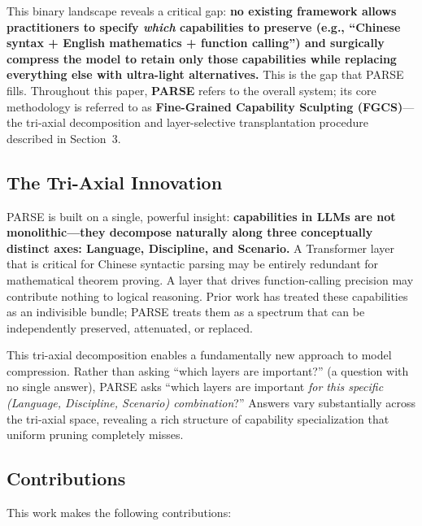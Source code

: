 \documentclass[twocolumn]{article}
\begin{document}
This binary landscape reveals a critical gap: \textbf{no existing framework allows practitioners to specify \emph{which} capabilities to preserve (e.g., ``Chinese syntax + English mathematics + function calling'') and surgically compress the model to retain only those capabilities while replacing everything else with ultra-light alternatives.}
This is the gap that PARSE fills.
Throughout this paper, \textbf{PARSE} refers to the overall system; its core methodology is referred to as \textbf{Fine-Grained Capability Sculpting (FGCS)}---the tri-axial decomposition and layer-selective transplantation procedure described in Section~3.

\subsection{The Tri-Axial Innovation}

PARSE is built on a single, powerful insight: \textbf{capabilities in LLMs are not monolithic---they decompose naturally along three conceptually distinct axes: Language, Discipline, and Scenario.}
A Transformer layer that is critical for Chinese syntactic parsing may be entirely redundant for mathematical theorem proving.
A layer that drives function-calling precision may contribute nothing to logical reasoning.
Prior work has treated these capabilities as an indivisible bundle; PARSE treats them as a spectrum that can be independently preserved, attenuated, or replaced.

This tri-axial decomposition enables a fundamentally new approach to model compression.
Rather than asking ``which layers are important?'' (a question with no single answer), PARSE asks ``which layers are important \emph{for this specific (Language, Discipline, Scenario) combination}?''
Answers vary substantially across the tri-axial space, revealing a rich structure of capability specialization that uniform pruning completely misses.

\subsection{Contributions}

This work makes the following contributions:
\end{document}
